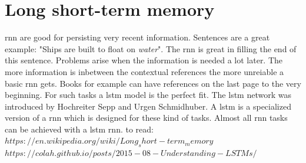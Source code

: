 \documentclass[10pt,a4paper]{article}
\begin{document}
\section{Long short-term memory}
\gls{rnn} are good for persisting very recent information. Sentences are a great example: "Ships are built to float on \textit{water}". The \gls{rnn} is great in filling the end of this sentence. Problems arise when the information is needed a lot later. The more information is inbetween the contextual references the more unreiable a basic \gls{rnn} gets. Books for example can have references on the last page to the very beginning. For such tasks a \gls{lstm} model is the perfect fit. The \gls{lstm} network was introduced by Hochreiter Sepp and Urgen Schmidhuber\citep{Hochreiter1997}. A \gls{lstm} is a specialized version of a \gls{rnn} which is designed for these kind of tasks. Almost all \gls{rnn} tasks can be achieved with a \gls{lstm} \gls{rnn}\cite{Olah2015}. 
to read: $https://en.wikipedia.org/wiki/Long_short-term_memory$
$https://colah.github.io/posts/2015-08-Understanding-LSTMs/$
\end{document}
